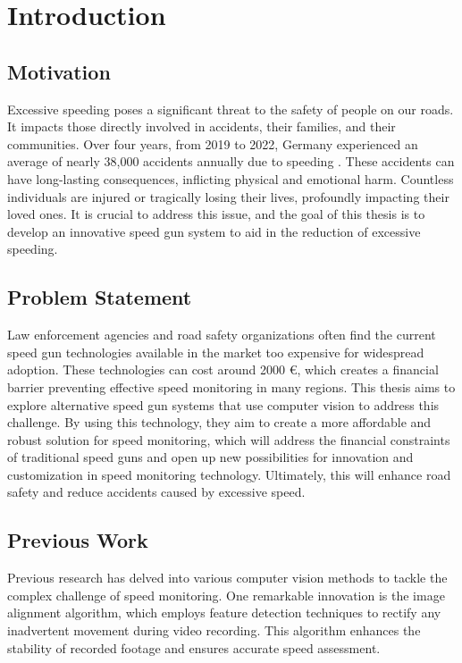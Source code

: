 \chapter{Introduction}

\section{Motivation}

Excessive speeding poses a significant threat to the safety of people on our roads. It impacts those directly involved in accidents, their families, and their communities. Over four years, from 2019 to 2022, Germany experienced an average of nearly 38,000 accidents annually due to speeding \cite{Statis_2023b}. These accidents can have long-lasting consequences, inflicting physical and emotional harm. Countless individuals are injured or tragically losing their lives, profoundly impacting their loved ones. It is crucial to address this issue, and the goal of this thesis is to develop an innovative speed gun system to aid in the reduction of excessive speeding.

\section{Problem Statement}
Law enforcement agencies and road safety organizations often find the current speed gun technologies available in the market too expensive for widespread adoption. These technologies can cost around 2000 €, which creates a financial barrier preventing effective speed monitoring in many regions. This thesis aims to explore alternative speed gun systems that use computer vision to address this challenge. By using this technology, they aim to create a more affordable and robust solution for speed monitoring, which will address the financial constraints of traditional speed guns and open up new possibilities for innovation and customization in speed monitoring technology. Ultimately, this will enhance road safety and reduce accidents caused by excessive speed.

\section{Previous Work}
Previous research has delved into various computer vision methods to tackle the complex challenge of speed monitoring. One remarkable innovation is the image alignment algorithm, which employs feature detection techniques to rectify any inadvertent movement during video recording. This algorithm enhances the stability of recorded footage and ensures accurate speed assessment.


